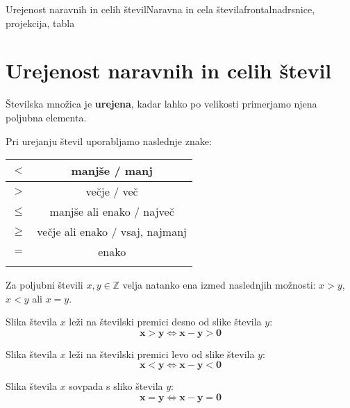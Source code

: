 \begin{priprava}{6}{}{Urejenost naravnih in celih števil}{Naravna in cela števila}{frontalna}{drsnice, projekcija, tabla}


    \section{Urejenost naravnih in celih števil}


    
        Številska množica je \textbf{urejena}, kadar lahko po velikosti primerjamo njena poljubna elementa.
    

    
        Pri urejanju števil uporabljamo naslednje znake:
        \begin{table}[H]
            \centering
            \addtolength{\tabcolsep}{6pt}
            \renewcommand{\arraystretch}{1.4}                
            \begin{tabular}{||c|c||} 
                \hhline{|t:==:t|}
                        $\mathbf{<}$ & manjše / manj  \\ 
                \hline
                        $\mathbf{>}$ & večje / več   \\ 
                \hline
                        $\mathbf{\leq}$ & manjše ali enako / največ   \\ 
                \hline
                        $\mathbf{\geq}$ & večje ali enako / vsaj, najmanj \\  
                \hline
                        $\mathbf{=}$ & enako \\
                \hhline{|b:==:b|}
            \end{tabular}
        \end{table}
    



    
        Za poljubni števili $x,y\in\mathbb{Z}$ velja natanko ena izmed naslednjih možnosti: $x>y$, $x<y$ ali $x=y$.
    \newline

            Slika števila $x$ leži na številski premici desno od slike števila $y$:
        $$\mathbf{x>y \Leftrightarrow x-y>0}$$
    

            Slika števila $x$ leži na številski premici levo od slike števila $y$:
        $$\mathbf{x<y \Leftrightarrow x-y<0}$$
    

            Slika števila $x$ sovpada s sliko števila $y$:
        $$\mathbf{x=y \Leftrightarrow x-y=0}$$
    

\end{priprava}
